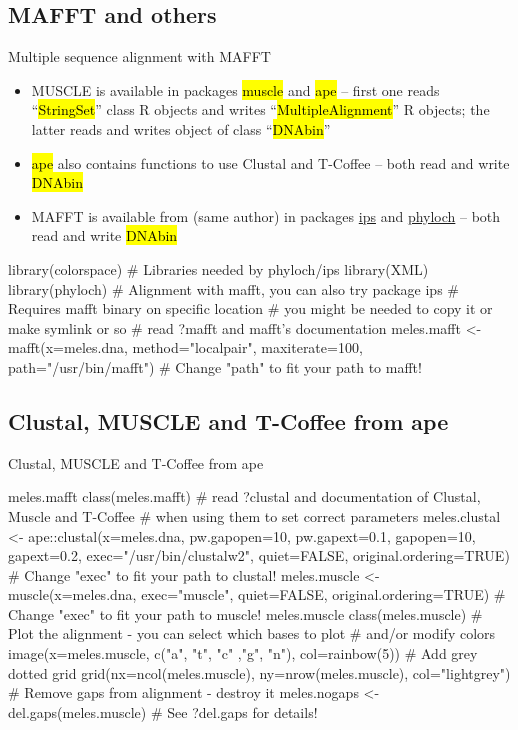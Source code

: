 \documentclass[compress, ucs, xelatex, 11pt, xcolor=svgnames,
  hyperref={
    bookmarks=true,
    unicode=true,
    colorlinks=true,
    pdftitle={Molecular data in R},
    plainpages=false,
    pdfauthor={Vojtech Zeisek},
    pdfsubject={Course about phylogeny and evolution in R},
    pdfcreator={XeLaTeX},
    pdfkeywords={R, evolution, phylogeny, molecular data},
    linkcolor=Tomato,
    anchorcolor=SaddleBrown,
    citecolor=Goldenrod,
    filecolor=DarkMagenta,
    menucolor=Sienna,
    urlcolor=DarkTurquoise,
    pdftex},
  url={hyphens, lowtilde} %
  ]{beamer}
\renewcommand{\texttt}[1]{\hl{\ttfamily #1}}
\begin{document}
\subsection{MAFFT and others}

\begin{frame}[fragile]{Multiple sequence alignment with MAFFT}
\begin{itemize}
 \item MUSCLE is available in packages \texttt{muscle} and \texttt{ape} -- first one reads ``\texttt{*StringSet}'' class R objects and writes ``\texttt{*MultipleAlignment}'' R objects; the latter reads and writes object of class ``\texttt{DNAbin}''
 \item \texttt{ape} also contains functions to use Clustal and T-Coffee -- both read and write \texttt{DNAbin}
 \item MAFFT is available from (same author) in packages \href{https://cran.r-project.org/web/packages/ips/index.html}{ips} and \href{http://www.christophheibl.de/Rpackages.html}{phyloch} -- both read and write \texttt{DNAbin}
\end{itemize}
  \begin{spluscode}
    library(colorspace) # Libraries needed by phyloch/ips
    library(XML)
    library(phyloch) # Alignment with mafft, you can also try package ips
    # Requires mafft binary on specific location
    # you might be needed to copy it or make symlink or so
    # read ?mafft and mafft's documentation
    meles.mafft <- mafft(x=meles.dna, method="localpair", maxiterate=100,
      path="/usr/bin/mafft") # Change "path" to fit your path to mafft!
  \end{spluscode}
\end{frame}

\subsection{Clustal, MUSCLE and T-Coffee from ape}

\begin{frame}[fragile]{Clustal, MUSCLE and T-Coffee from ape}
  \begin{spluscode}
    meles.mafft
    class(meles.mafft)
    # read ?clustal and documentation of Clustal, Muscle and T-Coffee
    # when using them to set correct parameters
    meles.clustal <- ape::clustal(x=meles.dna, pw.gapopen=10, pw.gapext=0.1,
      gapopen=10, gapext=0.2, exec="/usr/bin/clustalw2", quiet=FALSE,
      original.ordering=TRUE) # Change "exec" to fit your path to clustal!
    meles.muscle <- muscle(x=meles.dna, exec="muscle", quiet=FALSE,
      original.ordering=TRUE) # Change "exec" to fit your path to muscle!
    meles.muscle
    class(meles.muscle)
    # Plot the alignment - you can select which bases to plot
    # and/or modify colors
    image(x=meles.muscle, c("a", "t", "c" ,"g", "n"), col=rainbow(5))
    # Add grey dotted grid
    grid(nx=ncol(meles.muscle), ny=nrow(meles.muscle), col="lightgrey")
    # Remove gaps from alignment - destroy it
    meles.nogaps <- del.gaps(meles.muscle) # See ?del.gaps for details!
  \end{spluscode}
\end{frame}
\end{document}
